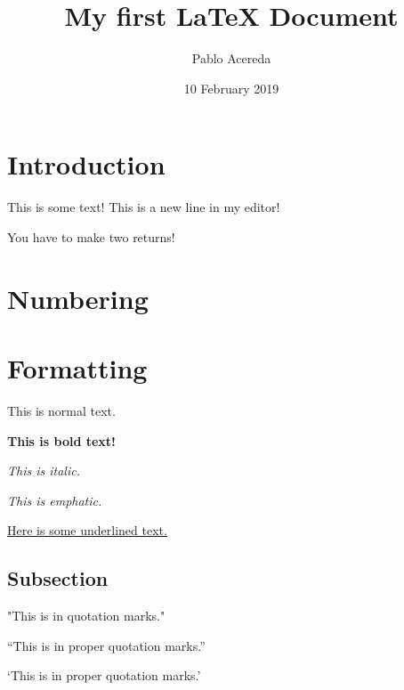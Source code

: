 \documentclass{article}
\author{Pablo Acereda}
\title{My first {\LaTeX} Document}
\date{10 February 2019}
\begin{document}
\maketitle

\section{Introduction}

This is some text!
This is a new line in my editor!

You have to make two returns!

\section{Numbering}

\section{Formatting}

This is normal text.

\textbf{This is bold text!}

\textit{This is italic.}

\emph{This is emphatic.}

\underline{Here is some underlined text.}

\subsection{Subsection}

"This is in quotation marks."

``This is in proper quotation marks.''

`This is in proper quotation marks.'
\end{document}
